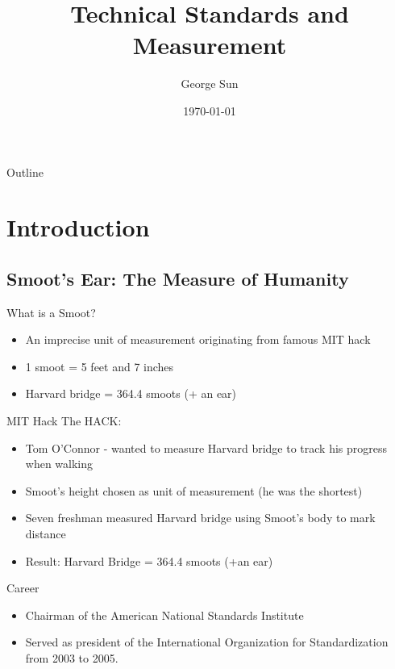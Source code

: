 \documentclass{beamer}
\title{Technical Standards and Measurement}
\author{George Sun}
\date{\today}
\begin{document}

\frame{\titlepage}

\section[Outline]{}
\begin{frame}{Outline}
  \tableofcontents
\end{frame}

\section{Introduction}
\subsection{Smoot's Ear: The Measure of Humanity}
\begin{frame}{What is a Smoot?}
  \begin{itemize}
    \item An imprecise unit of measurement originating from famous MIT hack
    \item 1 smoot = 5 feet and 7 inches
    \item Harvard bridge = 364.4 smoots (+ an ear)
  \end{itemize}
\end{frame}
\begin{frame}{MIT Hack}
  The HACK:
  \pause
  \begin{itemize}
    \item<2-> Tom O'Connor - wanted to measure Harvard bridge to track his progress when walking
    \item<3-> Smoot's height chosen as unit of measurement (he was the shortest)
    \item<4-> Seven freshman measured Harvard bridge using Smoot's body to mark distance
    \item<5-> Result: Harvard Bridge = 364.4 smoots (+an ear)
  \end{itemize}
\end{frame}
\begin{frame}{Career}
  \begin{itemize}
    \item<1-> Chairman of the American National Standards Institute 
    \item<2-> Served as president of the International Organization for Standardization from 2003 to 2005.
  \end{itemize}
\end{frame}
\end{document}
